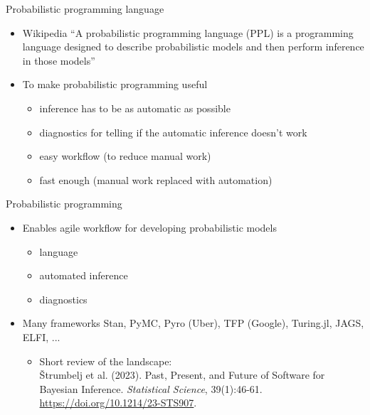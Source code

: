 \documentclass[finnish,english,t]{beamer}
\begin{document}
\begin{frame}{Probabilistic programming language}
  
  \begin{itemize}
  \item Wikipedia ``A probabilistic programming language (PPL) is a
    programming language designed to describe probabilistic models
    and then perform inference in those models''
    \pause
  \item To make probabilistic programming useful
    \begin{itemize}
    \item inference has to be as automatic as possible
    \item diagnostics for telling if the automatic inference doesn't work
    \item easy workflow (to reduce manual work)
    \item fast enough (manual work replaced with automation)
    \end{itemize}
  \end{itemize}
\end{frame}

\begin{frame}{Probabilistic programming}
  
  \begin{itemize}
  \item Enables agile workflow for developing probabilistic models
    \begin{itemize}
    \item language
    \item automated inference
    \item diagnostics
    \end{itemize}
  \item Many frameworks
    Stan, PyMC, Pyro (Uber), TFP (Google), Turing.jl, JAGS, ELFI, ...
    \begin{itemize}
    \item Short review of the landscape:\\
      {\small Štrumbelj et al. (2023). Past, Present, and Future of
        Software for Bayesian Inference. \textit{Statistical Science},
        39(1):46-61. \url{https://doi.org/10.1214/23-STS907}}.
      
    \end{itemize}
  \end{itemize}
  
\end{frame}
\end{document}
